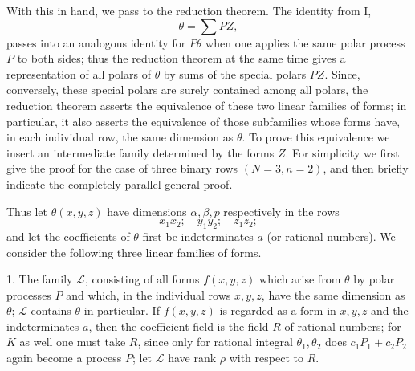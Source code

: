 With this in hand, we pass to the reduction theorem. The identity from I,
\[
  \theta=\sum PZ,
\]
passes into an analogous identity for $P\theta$ when one applies the same polar process $P$ to both sides; thus the reduction theorem at the same time gives a representation of all polars of $\theta$ by sums of the special polars $PZ$. Since, conversely, these special polars are surely contained among all polars, the reduction theorem asserts the equivalence of these two linear families of forms; in particular, it also asserts the equivalence of those subfamilies whose forms have, in each individual row, the same dimension as $\theta$. To prove this equivalence we insert an intermediate family determined by the forms $Z$. For simplicity we first give the proof for the case of three binary rows $(N=3,n=2)$, and then briefly indicate the completely parallel general proof.

Thus let $\theta(x,y,z)$ have dimensions $\alpha,\beta,p$ respectively in the rows
\[
  x_1x_2;\quad y_1y_2;\quad z_1z_2;
\]
and let the coefficients of $\theta$ first be indeterminates $a$ (or rational numbers). We consider the following three linear families of forms.

1. The family $\mathcal L$, consisting of all forms $f(x,y,z)$ which arise from $\theta$ by polar processes $P$ and which, in the individual rows $x,y,z$, have the same dimension as $\theta$; $\mathcal L$ contains $\theta$ in particular. If $f(x,y,z)$ is regarded as a form in $x,y,z$ and the indeterminates $a$, then the coefficient field is the field $R$ of rational numbers; for $K$ as well one must take $R$, since only for rational integral $\theta_1,\theta_2$ does $c_1P_1+c_2P_2$ again become a process $P$; let $\mathcal L$ have rank $\rho$ with respect to $R$.

